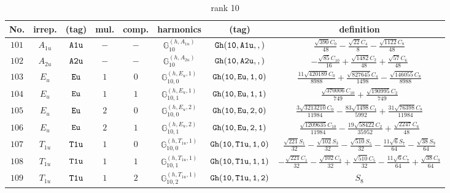 \documentclass[fleqn,8pt]{jsarticle}
\begin{document}
\begin{table}[ht!]
\begin{center}
\caption{rank 10}
\renewcommand{\arraystretch}{1.3}
\begin{tabular}{cccccccc} \hline \hline
No. & irrep. & (tag) & mul. & comp. & harmonics & (tag) & definition \\ \hline
$ 101 $ & $ A_{1u} $ & $ {\tt A1u} $ & $ - $ & $ - $ & $ \mathbb{G}_{10}^{(h,A_{1u})} $ & $ {\tt Gh(10,A1u,,)} $ & $ \frac{\sqrt{390} C_{0}}{48} - \frac{\sqrt{22} C_{4}}{8} - \frac{\sqrt{1122} C_{8}}{48} $ \\
$ 102 $ & $ A_{2u} $ & $ {\tt A2u} $ & $ - $ & $ - $ & $ \mathbb{G}_{10}^{(h,A_{2u})} $ & $ {\tt Gh(10,A2u,,)} $ & $ - \frac{\sqrt{85} C_{10}}{16} + \frac{\sqrt{1482} C_{2}}{48} + \frac{\sqrt{57} C_{6}}{48} $ \\
$ 103 $ & $ E_{u} $ & $ {\tt Eu} $ & $ 1 $ & $ 0 $ & $ \mathbb{G}_{10,0}^{(h,E_{u},1)} $ & $ {\tt Gh(10,Eu,1,0)} $ & $ \frac{11 \sqrt{420189} C_{0}}{8988} + \frac{\sqrt{827645} C_{4}}{1498} - \frac{\sqrt{146055} C_{8}}{8988} $ \\
$ 104 $ & $ E_{u} $ & $ {\tt Eu} $ & $ 1 $ & $ 1 $ & $ \mathbb{G}_{10,1}^{(h,E_{u},1)} $ & $ {\tt Gh(10,Eu,1,1)} $ & $ \frac{\sqrt{370006} C_{10}}{749} + \frac{\sqrt{190995} C_{2}}{749} $ \\
$ 105 $ & $ E_{u} $ & $ {\tt Eu} $ & $ 2 $ & $ 0 $ & $ \mathbb{G}_{10,0}^{(h,E_{u},2)} $ & $ {\tt Gh(10,Eu,2,0)} $ & $ \frac{3 \sqrt{3213210} C_{0}}{11984} - \frac{83 \sqrt{1498} C_{4}}{5992} + \frac{31 \sqrt{76398} C_{8}}{11984} $ \\
$ 106 $ & $ E_{u} $ & $ {\tt Eu} $ & $ 2 $ & $ 1 $ & $ \mathbb{G}_{10,1}^{(h,E_{u},2)} $ & $ {\tt Gh(10,Eu,2,1)} $ & $ \frac{\sqrt{1209635} C_{10}}{11984} - \frac{19 \sqrt{58422} C_{2}}{35952} + \frac{\sqrt{2247} C_{6}}{48} $ \\
$ 107 $ & $ T_{1u} $ & $ {\tt T1u} $ & $ 1 $ & $ 0 $ & $ \mathbb{G}_{10,0}^{(h,T_{1u},1)} $ & $ {\tt Gh(10,T1u,1,0)} $ & $ \frac{\sqrt{221} S_{1}}{32} - \frac{\sqrt{102} S_{3}}{32} - \frac{\sqrt{510} S_{5}}{32} - \frac{11 \sqrt{6} S_{7}}{64} - \frac{\sqrt{38} S_{9}}{64} $ \\
$ 108 $ & $ T_{1u} $ & $ {\tt T1u} $ & $ 1 $ & $ 1 $ & $ \mathbb{G}_{10,1}^{(h,T_{1u},1)} $ & $ {\tt Gh(10,T1u,1,1)} $ & $ - \frac{\sqrt{221} C_{1}}{32} - \frac{\sqrt{102} C_{3}}{32} + \frac{\sqrt{510} C_{5}}{32} - \frac{11 \sqrt{6} C_{7}}{64} + \frac{\sqrt{38} C_{9}}{64} $ \\
$ 109 $ & $ T_{1u} $ & $ {\tt T1u} $ & $ 1 $ & $ 2 $ & $ \mathbb{G}_{10,2}^{(h,T_{1u},1)} $ & $ {\tt Gh(10,T1u,1,2)} $ & $ S_{8} $ \\

\end{tabular}
\end{center}
\end{table}
\end{document}
